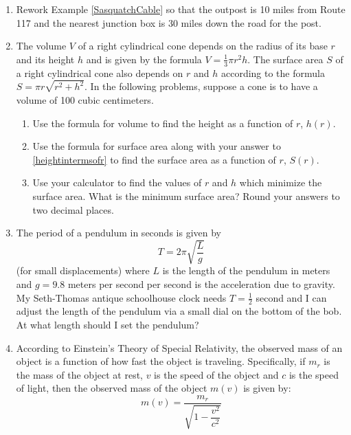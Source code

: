 \documentclass{ximera}
\begin{document}
\begin{enumerate}
\setcounter{enumi}{\value{HW}}

\item  Rework Example \ref{SasquatchCable} so that the outpost is 10 miles from Route 117 and the nearest junction box is 30 miles down the road for the post.


\item  The volume $V$ of a right cylindrical cone depends on the radius of its base $r$ and its height $h$ and is given by the formula $V = \frac{1}{3} \pi r^2 h$.  The surface area $S$ of a right cylindrical cone also depends on $r$ and $h$ according to the formula $S = \pi r \sqrt{r^2+h^2}$.  In the following problems, suppose a cone is to have a volume of 100 cubic centimeters. 

\begin{enumerate}

\item  \label{heightintermsofr} Use the formula for volume to find the height as a function of $r$, $h(r)$.
\item  Use the formula for surface area along with  your answer to \ref{heightintermsofr} to find the surface area as a function of $r$, $S(r)$.
\item  Use your calculator to find the values of $r$ and $h$ which minimize the surface area.  What is the minimum surface area?  Round your answers to two decimal places.

\end{enumerate}


\item \label{pendulumproblem} The period of a pendulum in seconds is given by \[T = 2\pi \sqrt{\dfrac{L}{g}}\](for small displacements) where $L$ is the length of the pendulum in meters and $g = 9.8$ meters per second per second is the acceleration due to gravity.  My Seth-Thomas antique schoolhouse clock needs $T = \frac{1}{2}$ second and I can adjust the length of the pendulum via a small dial on the bottom of the bob.  At what length should I set the pendulum?


\item According to Einstein's Theory of Special Relativity, the observed mass  of an object is a function of how fast the object is traveling.  Specifically, if  $m_{r}$ is the mass of the object at rest, $v$ is the speed of the object and $c$ is the speed of light, then the observed mass of the object $m(v)$ is given by:
\[m(v) = \dfrac{m_{r}}{\sqrt{1 - \dfrac{v^{2}}{c^{2}}}}\] 


\end{enumerate}
\end{document}
